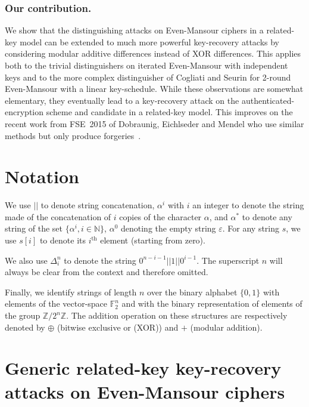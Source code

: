 \subsubsection{Our contribution.}
We show that the distinguishing attacks on Even-Mansour ciphers in a related-key
model can be extended to much more powerful key-recovery attacks by considering modular
additive differences instead of XOR differences. This applies both to the trivial
distinguishers on iterated Even-Mansour with independent keys and to the more complex distinguisher
of Cogliati and Seurin for 2-round Even-Mansour with a linear key-schedule. While these observations
are somewhat elementary, they eventually lead to a key-recovery attack
on the authenticated-encryption scheme and \caesar candidate \proestotr in a related-key model. This improves on the recent work
from FSE~2015 of Dobraunig, Eichlseder and Mendel who use similar methods but only produce forgeries~\cite{DEM15}.

\section{Notation}

We use $||$ to denote string concatenation, $\alpha^i$ with $i$ an integer
to denote the string
made of the concatenation of $i$ copies of the character $\alpha$, and $\alpha^*$
to denote any string of the set $\{\alpha^i, i \in \mathbb{N}\}$, $\alpha^0$
denoting the empty string $\varepsilon$. For any string $s$, we use
$s[i]$ to denote its $i^\text{th}$ element (starting from zero).

We also use $\Delta_i^n$ to denote the string
$0^{n-i-1} || 1 || 0^{i - 1}$. The superscript $n$ will always
be clear from the context and therefore omitted.

Finally, we identify strings of length $n$ over the binary alphabet $\{0,1\}$ with elements of
the vector-space $\mathbb{F}_2^n$ and with the binary representation of elements of
the group $\mathbb{Z}/2^n\mathbb{Z}$. The addition operation on these structures
are respectively denoted by $\oplus$ (bitwise exclusive or (XOR)) and $+$ (modular addition).

\section{Generic related-key key-recovery attacks on Even-Mansour ciphers}
\label{sec:gen}


